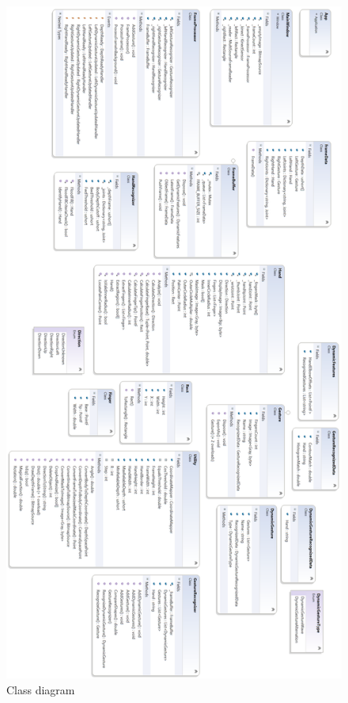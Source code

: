 \documentclass[a4paper,11pt,oneside]{article}
\begin{document}
 \begin{figure}[H]
  \centering
  \includegraphics[scale=0.38]{class-diagram.png}
  \caption{Class diagram}
  \end{figure}

\newpage
\end{document}

